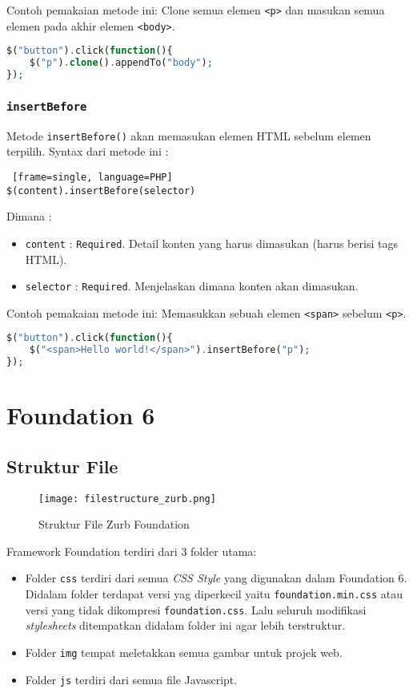 \begin{itemize}
Contoh pemakaian metode ini: Clone semua elemen \texttt{<p>} dan masukan semua elemen pada akhir elemen \texttt{<body>}.
\begin{lstlisting}[frame=single, language=PHP]
$("button").click(function(){
	$("p").clone().appendTo("body");
});
\end{lstlisting}


\subsubsection{\texttt{insertBefore}}
Metode \texttt{insertBefore()} akan memasukan elemen HTML sebelum elemen terpilih.
Syntax dari metode ini :
\begin{lstlisting} [frame=single, language=PHP]
$(content).insertBefore(selector)
\end{lstlisting}
Dimana :
\begin{itemize}
	\item \texttt{content} : \texttt{Required}. Detail konten yang harus dimasukan (harus berisi tags HTML).
	\item \texttt{selector} : \texttt{Required}. Menjelaskan dimana konten akan dimasukan. 
\end{itemize}

Contoh pemakaian metode ini: Memasukkan sebuah elemen \texttt{<span>} sebelum \texttt{<p>}.
\begin{lstlisting}[frame=single, language=PHP]
$("button").click(function(){
	$("<span>Hello world!</span>").insertBefore("p");
});
\end{lstlisting}

\section{Foundation 6}

\subsection{Struktur File}
\begin{figure} [H]
	\centering  
	\texttt{[image: filestructure\_zurb.png]}  
	\caption{Struktur File Zurb Foundation} 
\end{figure}

Framework Foundation terdiri dari 3 folder utama:
\begin{itemize}
\item Folder \texttt{css} terdiri dari semua \textit{CSS Style} yang digunakan dalam Foundation 6. Didalam folder terdapat versi yag diperkecil yaitu \verb|foundation.min.css| atau versi yang tidak dikompresi \verb|foundation.css|. Lalu seluruh modifikasi \textit{stylesheets} ditempatkan didalam folder ini agar lebih terstruktur.
\item Folder \texttt{img} tempat meletakkan semua gambar untuk projek web.
\item Folder \texttt{js} terdiri dari semua file Javascript.
\end{itemize} 


\end{itemize}
